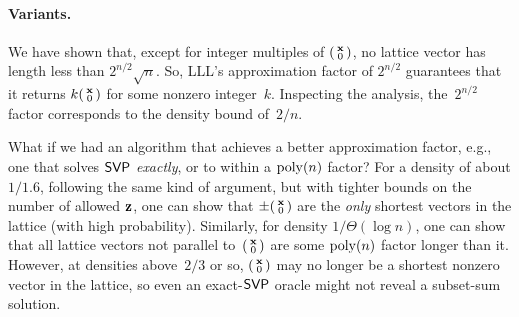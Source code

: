 \documentclass[11pt]{article}
\newcommand{\smlmat}[1]{\parens{
    \begin{smallmatrix}
      #1
    \end{smallmatrix}
  }
}
\begin{document}
\paragraph{Variants.}

We have shown that, except for integer multiples of
$\smlmat{\vecx \\ 0}$, no lattice vector has length less than
$2^{n/2} \sqrt{n}$. So, LLL's approximation factor of $2^{n/2}$
guarantees that it returns $k \smlmat{\vecx \\ 0}$ for some nonzero
integer~$k$. Inspecting the analysis, the~$2^{n/2}$ factor corresponds
to the density bound of~$2/n$.

What if we had an algorithm that achieves a better approximation
factor, e.g., one that solves $\mathsf{SVP}$ \emph{exactly}, or to within a
$\operatorname{poly}(n)$ factor? For a density of about $1/1.6$, following the same
kind of argument, but with tighter bounds on the number of allowed
$\mathbf{z}$, one can show that $\pm \smlmat{\vecx \\ 0}$ are the
\emph{only} shortest vectors in the lattice (with high probability).
Similarly, for density $1/\Theta(\log n)$, one can show that all
lattice vectors not parallel to~$\smlmat{\vecx \\ 0}$ are some
$\operatorname{poly}(n)$ factor longer than it. However, at densities above~$2/3$ or
so, $\smlmat{\vecx \\ 0}$ may no longer be a shortest nonzero vector
in the lattice, so even an exact-$\mathsf{SVP}$ oracle might not reveal a
subset-sum solution.
    


\end{document}
